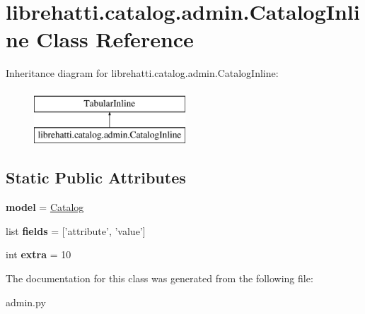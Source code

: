 \hypertarget{classlibrehatti_1_1catalog_1_1admin_1_1CatalogInline}{\section{librehatti.\-catalog.\-admin.\-Catalog\-Inline Class Reference}
\label{classlibrehatti_1_1catalog_1_1admin_1_1CatalogInline}
}
Inheritance diagram for librehatti.\-catalog.\-admin.\-Catalog\-Inline\-:\begin{figure}[H]
\begin{center}
\leavevmode
\includegraphics[height=2.000000cm]{classlibrehatti_1_1catalog_1_1admin_1_1CatalogInline}
\end{center}
\end{figure}
\subsection*{Static Public Attributes}
\begin{DoxyCompactItemize}
\item 
\hypertarget{classlibrehatti_1_1catalog_1_1admin_1_1CatalogInline_a788b8a976035dbb1a445475a27aa7587}{{\bfseries model} = \hyperlink{classlibrehatti_1_1catalog_1_1models_1_1Catalog}{Catalog}}\label{classlibrehatti_1_1catalog_1_1admin_1_1CatalogInline_a788b8a976035dbb1a445475a27aa7587}

\item 
\hypertarget{classlibrehatti_1_1catalog_1_1admin_1_1CatalogInline_a365f77bd579f3bbd2d508e96dc1c46c8}{list {\bfseries fields} = \mbox{[}'attribute', 'value'\mbox{]}}\label{classlibrehatti_1_1catalog_1_1admin_1_1CatalogInline_a365f77bd579f3bbd2d508e96dc1c46c8}

\item 
\hypertarget{classlibrehatti_1_1catalog_1_1admin_1_1CatalogInline_a674150452581d0772d76f837688226cd}{int {\bfseries extra} = 10}\label{classlibrehatti_1_1catalog_1_1admin_1_1CatalogInline_a674150452581d0772d76f837688226cd}

\end{DoxyCompactItemize}


The documentation for this class was generated from the following file\-:\begin{DoxyCompactItemize}
\item 
admin.\-py\end{DoxyCompactItemize}
